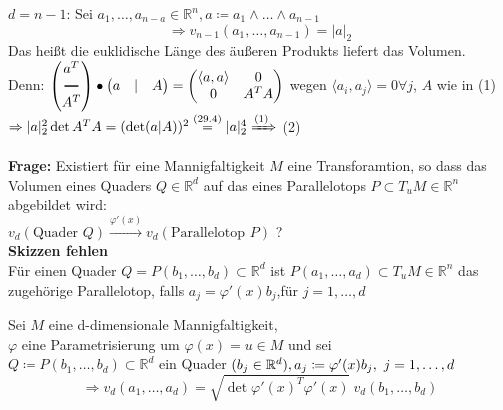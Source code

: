 \begin{beispiel}
    $d = n-1 $: Sei $a_1, \ldots, a_{n-a} \in \mathbb{R}^n, 
    a \coloneqq a_1 \wedge \ldots \wedge a_{n-1} $
    \begin{equation}
        \Rightarrow v_{n-1} (a_1, \ldots, a_{n-1}) = |a|_2
    \end{equation}
    Das heißt die euklidische Länge des äußeren Produkts liefert das Volumen.\\
    Denn: $
    \begin{pmatrix}
        a^T \\
        \rule[.5ex]{1em}{1pt}\\
        A^T
    \end{pmatrix}
    \bullet
    \begin{pmatrix}
        a & | & A 
    \end{pmatrix}
    =
    \begin{pmatrix}
        \langle a,a \rangle & 0 \\
        0 & A^T A
    \end{pmatrix}
    $ wegen $\langle a_i, a_j \rangle = 0 \forall j $, $A$ wie in (1)\\
    $\Rightarrow |a|_2^2 \det A^T A = (\det (a|A))^2 \stackrel{(29.4)}{=}
    |a|_2^4 \xRightarrow{\text{(1)}} $ (2)
\end{beispiel}

\textbf{Frage:} Existiert für eine Mannigfaltigkeit $M$ eine Transforamtion, so dass das
Volumen eines Quaders $Q \in \mathbb{R}^d $ auf das eines Parallelotops 
$P \subset T_uM \in \mathbb{R}^n $ abgebildet wird: \\
$v_d(\text{Quader }Q) \xrightarrow{\varphi'(x)} v_d(\text{Parallelotop } P) $ ?\\
\textbf{Skizzen fehlen}\\
Für einen Quader $Q = P(b_1, \ldots, b_d) \subset \mathbb{R}^d $ ist 
$P(a_1, \ldots, a_d) \subset T_uM \in \mathbb{R}^n $ das zugehörige Parallelotop, falls
$a_j = \varphi'(x) b_j $,für $ j=1, \ldots, d $

\begin{satz}
    Sei $M$ eine d-dimensionale Mannigfaltigkeit,\\
    $\varphi$ eine Parametrisierung um $\varphi(x) = u \in M $
    und sei \\
    $Q \coloneqq P(b_1, \ldots, b_d) \subset \mathbb{R}^d $ ein Quader 
    $(b_j \in \mathbb{R}^d), \\
    a_j \coloneqq \varphi'(x) b_j,\ j= 1, \ldots, d $ \\
    \begin{equation}
        \Longrightarrow 
        v_d(a_1, \ldots, a_d) = 
        \sqrt{\det \varphi'(x)^T \varphi'(x)}\ v_d(b_1, \ldots, b_d)
    \end{equation}
\end{satz}


